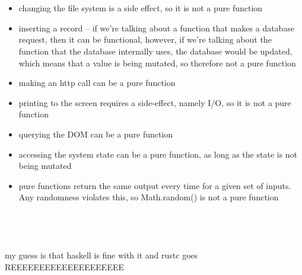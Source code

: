 \documentclass[letterpaper]{article}
\begin{document}
\section{}
\begin{itemize}
  \item changing the file system is a side effect, so it is not a pure function
  \item inserting a record -- if we're talking about a function that makes a
    database request, then it can be functional, however, if we're talking about
    the function that the database internally uses, the database would be
    updated, which means that a value is being mutated, so therefore not a pure
    function
  \item making an http call can be a pure function
  \item printing to the screen requires a side-effect, namely I/O, so it is not
    a pure function
  \item querying the DOM can be a pure function
  \item accessing the system state can be a pure function, as long as the state
    is not being mutated
  \item pure functions return the same output every time for a given set of
    inputs. Any randomness violates this, so Math.random() is not a pure
    function
\end{itemize}


\section{}
\inputminted[]{rust}{7.rs}

\section{}

\section{}
my guess is that haskell is fine with it and rustc goes REEEEEEEEEEEEEEEEEEEE
\end{document}
